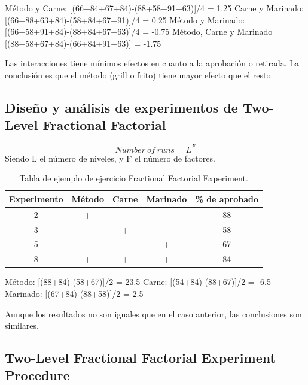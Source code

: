 \documentclass[oneside]{book}
\begin{document}
Método y Carne: [(66+84+67+84)-(88+58+91+63)]/4 = 1.25 \newline
Carne y Marinado: [(66+88+63+84)-(58+84+67+91)]/4 = 0.25 \newline
Método y Marinado: [(66+58+91+84)-(88+84+67+63)]/4 = -0.75 \newline
Método, Carne y Marinado [(88+58+67+84)-(66+84+91+63)] = -1.75 

Las interacciones tiene mínimos efectos en cuanto a la aprobación o retirada. La conclusión es que el método (grill o frito) tiene mayor efecto que el resto.

\subsection{Diseño y análisis de experimentos de Two-Level Fractional Factorial}
\begin{equation}
Number \ of \ runs = L^F
\end{equation}
Siendo L el número de niveles, y F el número de factores.

\begin{table}[H]
	\begin{center}
		\begin{tabular}{|c|c|c|c|c|}
			\hline Experimento & Método & Carne & Marinado & \% de aprobado \\ 
			\hline 2 & + & - & - & 88 \\ 
			\hline 3 & - & + & - & 58 \\ 
			\hline 5 & - & - & + & 67 \\ 
			\hline 8 & + & + & + & 84 \\ 
			\hline 
		\end{tabular} 
		\caption{Tabla de ejemplo de ejercicio Fractional Factorial Experiment.}
	\end{center}
\end{table}

Método: [(88+84)-(58+67)]/2 = 23.5 \newline
Carne: [(54+84)-(88+67)]/2 = -6.5 \newline
Marinado: [(67+84)-(88+58)]/2 = 2.5 

Aunque los resultados no son iguales que en el caso anterior, las conclusiones son similares.

\subsection{Two-Level Fractional Factorial Experiment Procedure}
\end{document}
